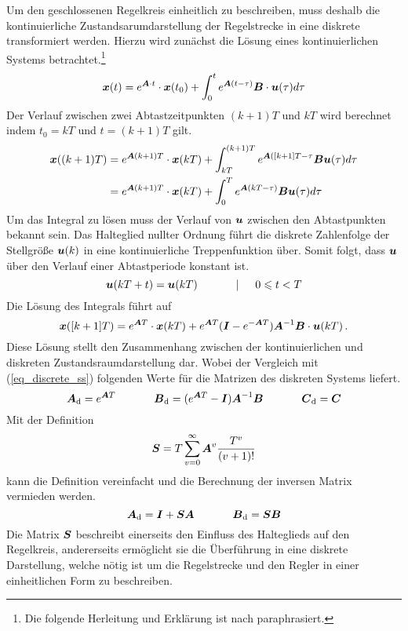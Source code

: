 Um den geschlossenen Regelkreis einheitlich zu beschreiben, muss deshalb die kontinuierliche Zustandsarumdarstellung der Regelstrecke in eine diskrete transformiert werden. Hierzu wird zunächst die Lösung eines kontinuierlichen Systems  betrachtet.\footnote{Die folgende Herleitung und Erklärung ist nach \cite[S. 170 f.]{UnbehauenRT2} paraphrasiert.}
\begin{equation}
\boldsymbol{x}(t) = e^{\boldsymbol{A}\cdot t}\cdot \boldsymbol{x}(t_0) + \int^t_0 e^{\boldsymbol{A}(t-\tau)}\boldsymbol{B}\cdot \boldsymbol{u}(\tau)d\tau
\end{equation}
Der Verlauf zwischen zwei Abtastzeitpunkten $(k+1)T$ und $kT$ wird berechnet indem $t_0=kT$ und $t=(k+1)T$ gilt.
\begin{equation}
\begin{split}
\boldsymbol{x}( (k+1)T) &= e^{\boldsymbol{A}(k+1)T}\cdot \boldsymbol{x}(kT) + \int^{(k+1)T}_{kT} e^{\boldsymbol{A}([k+1]T-\tau}\boldsymbol{B}\boldsymbol{u}(\tau)d\tau \\
&= e^{\boldsymbol{A}(k+1)T}\cdot \boldsymbol{x}(kT) + \int^T_0 e^{\boldsymbol{A}(kT-\tau)}\boldsymbol{B}\boldsymbol{u}(\tau)d\tau
\end{split}
\end{equation}
Um das Integral zu lösen muss der Verlauf von $\boldsymbol{u}$ zwischen den Abtastpunkten bekannt sein. Das Halteglied nullter Ordnung führt die diskrete Zahlenfolge der Stellgröße $\boldsymbol{u}(k)$ in eine kontinuierliche Treppenfunktion über. Somit folgt, dass $\boldsymbol{u}$ über den Verlauf einer Abtastperiode konstant ist.
\begin{equation}
\boldsymbol{u}(kT+t) = \boldsymbol{u}(kT) \hspace{35pt} \vert \hspace{15pt} 0 \leqslant t < T
\end{equation}
Die Lösung des Integrals führt auf
\begin{equation}
\boldsymbol{x}([k+1]T) = e^{\boldsymbol{A}T}\cdot \boldsymbol{x}(kT) + e^{\boldsymbol{A}T}(\boldsymbol{I}-e^{-\boldsymbol{A}T})\boldsymbol{A}^{-1}\boldsymbol{B}\cdot \boldsymbol{u}(kT)\,.
\end{equation}
Diese Lösung stellt den Zusammenhang zwischen der kontinuierlichen und diskreten Zustandsraumdarstellung dar. Wobei der Vergleich mit (\ref{eq_discrete_ss}) folgenden Werte für die Matrizen des diskreten Systems  liefert.
\begin{equation}
\boldsymbol{A}_{\text{d}} = e^{\boldsymbol{A}T} \hspace{35pt} \boldsymbol{B}_{\text{d}} = (e^{\boldsymbol{A}T}-\boldsymbol{I})\boldsymbol{A}^{-1}\boldsymbol{B} \hspace{35pt} \boldsymbol{C}_{\text{d}} = \boldsymbol{C}
\end{equation}
Mit der Definition
\begin{equation}
\boldsymbol{S} = T \sum^{\infty}_{v=0}\boldsymbol{A}^v\frac{T^v}{(v+1)!}
\end{equation}
kann die Definition vereinfacht und die Berechnung der inversen Matrix vermieden werden.
\begin{equation}
\boldsymbol{A}_{\text{d}} = \boldsymbol{I}+\boldsymbol{S}\boldsymbol{A}\hspace{35pt} \boldsymbol{B}_{\text{d}} = \boldsymbol{SB}
\end{equation}
Die Matrix $\boldsymbol{S}$ beschreibt einerseits den Einfluss des Halteglieds auf den Regelkreis, andererseits ermöglicht sie die Überführung in eine diskrete Darstellung, welche nötig ist um die Regelstrecke und den Regler in einer einheitlichen Form zu beschreiben. 